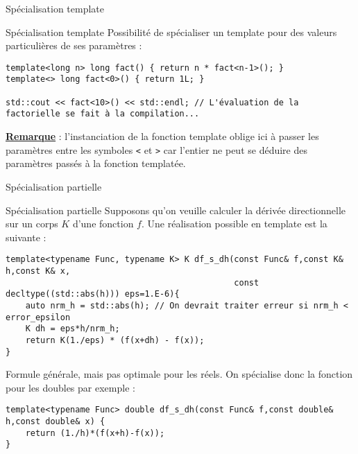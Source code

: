 \documentclass[handout,10pt]{beamer}
\begin{document}
\begin{frame}[fragile]{Spécialisation template}
\small
\begin{block}{Spécialisation template}
Possibilité de spécialiser un template pour des valeurs particulières de ses paramètres :
\begin{lstlisting}
template<long n> long fact() { return n * fact<n-1>(); }
template<> long fact<0>() { return 1L; }

std::cout << fact<10>() << std::endl; // L'évaluation de la factorielle se fait à la compilation...
\end{lstlisting}
\textbf{\underline{Remarque}} : l'instanciation de la fonction template oblige ici à passer les paramètres entre les symboles
\lstinline$<$ et \lstinline$>$ car l'entier ne peut se déduire des paramètres passés à la fonction templatée.
\end{block}
\end{frame}
\begin{frame}[fragile]{Spécialisation partielle}
\small
\begin{block}{Spécialisation partielle}
Supposons qu'on veuille calculer la dérivée directionnelle sur un corps $K$ d'une fonction $f$.
Une réalisation possible en template est la suivante :
\begin{lstlisting}
template<typename Func, typename K> K df_s_dh(const Func& f,const K& h,const K& x,
                                              const decltype((std::abs(h))) eps=1.E-6){
    auto nrm_h = std::abs(h); // On devrait traiter erreur si nrm_h < error_epsilon
    K dh = eps*h/nrm_h;
    return K(1./eps) * (f(x+dh) - f(x));
}\end{lstlisting}
Formule générale, mais pas optimale pour les réels. On spécialise donc la fonction pour les doubles par exemple :
\begin{lstlisting}
template<typename Func> double df_s_dh(const Func& f,const double& h,const double& x) {    
    return (1./h)*(f(x+h)-f(x));
}\end{lstlisting}
\end{block}
\end{frame}
\end{document}
